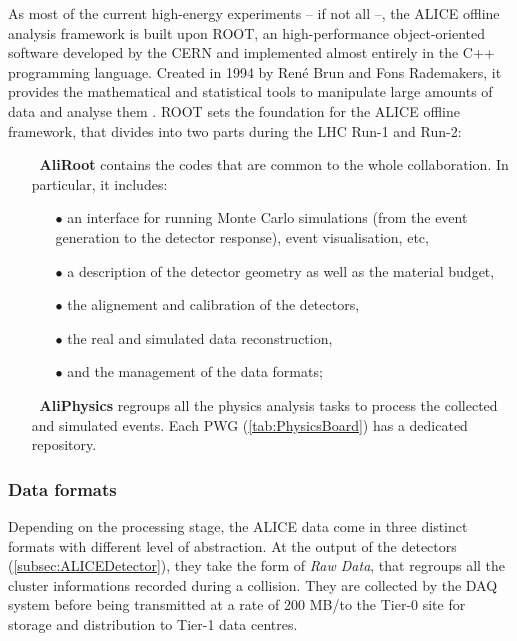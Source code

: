 As most of the current high-energy experiments -- if not all --, the ALICE offline analysis framework is built upon ROOT, an high-performance object-oriented software developed by the CERN and implemented almost entirely in the C++ programming language. Created in 1994 by René Brun and Fons Rademakers, it provides the mathematical and statistical tools to manipulate large amounts of data and analyse them \cite{renebrunandfonsrademakersROOTObjectOriented}. ROOT sets the foundation for the ALICE offline framework, that divides into two parts during the LHC Run-1 and Run-2:
\begin{itemize}
\item[$\ $] \textbf{AliRoot} \cite{alicecollaborationAliRoot} contains the codes that are common to the whole collaboration. In particular, it includes:
\begin{itemize}
\item[$\bullet$] an interface for running Monte Carlo simulations (from the event generation to the detector response), event visualisation, etc,
\item[$\bullet$] a description of the detector geometry as well as the material budget,
\item[$\bullet$] the alignement and calibration of the detectors, 
\item[$\bullet$] the real and simulated data reconstruction,
\item[$\bullet$] and the management of the data formats;
\end{itemize}
\item[$\ $] \textbf{AliPhysics} \cite{alicecollaborationAliPhysics2023} regroups all the physics analysis tasks to process the collected and simulated events. Each PWG (\tab\ref{tab:PhysicsBoard}) has a dedicated repository.
\end{itemize}

\subsubsection{Data formats}
\label{subsubsec:DataFormats}

Depending on the processing stage, the ALICE data come in three distinct formats with different level of abstraction. At the output of the detectors (\Sec\ref{subsec:ALICEDetector}), they take the form of \textit{Raw Data}, that regroups all the cluster informations recorded during a collision. They are collected by the DAQ system before being transmitted at a rate of 200 MB/\second to the Tier-0 site for storage and distribution to Tier-1 data centres. 

